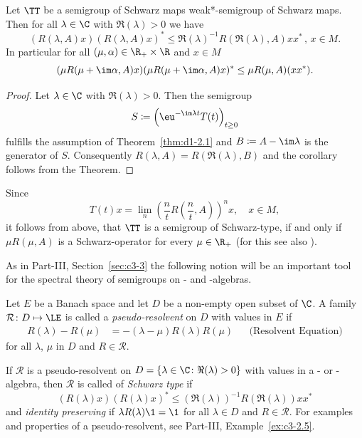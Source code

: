 \begin{corollary}\label{cor:d1-2.2}
Let $ \TT $ be a semigroup of Schwarz maps \resp weak*-semigroup of Schwarz maps.
Then for all $ \lambda \in \C $ with $ \Re(\lambda)  > 0 $ we have
\[
	\left( R(\lambda,A)x \right) \left( R(\lambda,A)x \right)^{*} 
		\leq \Re(\lambda)^{-1} R(\Re(\lambda),A)xx^{*} \, , \, x \in M .
\]
In particular for all $ (\mu,\alpha) \in \R_{+} \times \R $ and $ x \in M $
\[
(\mu R(\mu + \im \alpha,A)x)(\mu R(\mu + \im \alpha,A)x)^{*} \leq \mu R(\mu,A)(xx^{*}).
\]
\end{corollary}
\begin{proof}
Let $ \lambda \in \C $ with $ \Re(\lambda) > 0 $.
Then the semigroup
\[
S \coloneqq \left(\eu^{- \im  \lambda t }T(t) \right)_{t \geq 0}
\]
fulfills the assumption of Theorem~\ref{thm:d1-2.1} and $ B \coloneqq A - \im \lambda $ is the generator of\/ $ S $.
Consequently $ R(\lambda,A) = R(\Re(\lambda),B) $ and the corollary follows from the Theorem.
\end{proof}
\begin{remark}\label{rem:d1-2.3}
Since 
%
\[
	T(t)x = \lim_{n} \left( \frac{n}{t} R\left(\frac{n}{t}, A\right) \right)^{n} x , \quad x \in M , 
\]
%
it follows from above, that $ \TT $ is a semigroup of Schwarz-type, if and only if\/ $ \mu R( \mu, A) $ is a Schwarz-operator for every $ \mu \in \R_{+} $ (for this see also \textcite{brattelirobinson:1981}).
\end{remark}
As in Part-III, Section~\ref{sec:c3-3}  the following notion will be an important tool for the spectral theory of semigroups on \CA- and \WA-algebras.
\begin{definition}\label{def:d1-2.4}
Let $E$ be a Banach space and let $D$ be a non-empty open subset of\/ $\C$.
A family $ \mathcal{R} \colon D \mapsto \LE $ is called a \emph{pseudo-resolvent} on $ D $ with values in $ E $ if
\begin{align*}
	R(\lambda) - R(\mu) &= -(\lambda - \mu)R(\lambda)R(\mu) &&\text{(Resolvent Equation)}
\end{align*}
for all $ \lambda $, $ \mu $ in $ D $ and $ R \in \mathcal{R} $.
\end{definition}
If\/ $ \mathcal{R} $ is a {pseudo-resolvent} on $ D = \{\lambda \in \C \colon \Re(\lambda) > 0\} $ with values in a \CA- or \WA-algebra, then $ \mathcal{R} $ is called of \emph{Schwarz type} 
if
\[
	(R(\lambda)x)(R(\lambda)x)^{*} \leq (\Re (\lambda) )^{-1} R(\Re(\lambda))xx^{*}
\]
and \emph{identity preserving} if\/ $ \lambda R(\lambda)\1 = \1 $ for all $ \lambda \in D $ and $ R \in \mathcal{R} $.
For examples and properties of a pseudo-resolvent, see Part-III, Example~\ref{ex:c3-2.5}.

